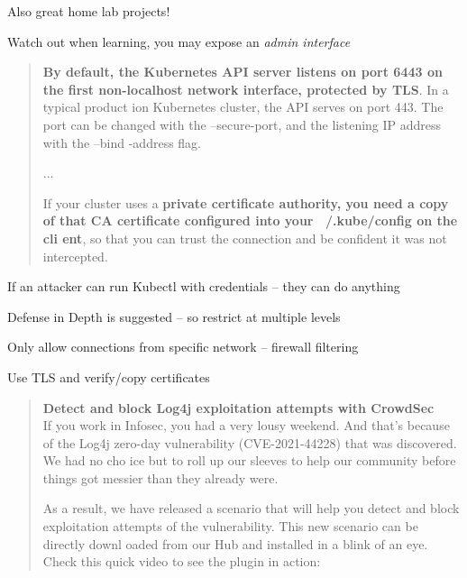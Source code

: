 \documentclass[Screen16to9,17pt]{foils}
\begin{document}
Also great home lab projects!



Watch out when learning, you may expose an \emph{admin interface}
\begin{quote}{\bf
By default, the Kubernetes API server listens on port 6443 on the first non-localhost network interface, protected by TLS}. In a typical product
ion Kubernetes cluster, the API serves on port 443. The port can be changed with the --secure-port, and the listening IP address with the --bind
-address flag.

...

If your cluster uses a {\bf private certificate authority, you need a copy of that CA certificate configured into your ~/.kube/config on the cli
ent}, so that you can trust the connection and be confident it was not intercepted.
\end{quote}

\begin{list2}
\item If an attacker can run Kubectl with credentials -- they can do anything
\item Defense in Depth is suggested -- so restrict at multiple levels
\item Only allow connections from specific network -- firewall filtering
\item Use TLS and verify/copy certificates
\end{list2}



\begin{quote}
{\bf Detect and block Log4j exploitation attempts with CrowdSec}\\
If you work in Infosec, you had a very lousy weekend. And that’s because of the Log4j zero-day vulnerability (CVE-2021-44228) that was discovered. We had no cho
ice but to roll up our sleeves to help our community before things got messier than they already were.

As a result, we have released a scenario that will help you detect and block exploitation attempts of the vulnerability. This new scenario can be directly downl
oaded from our Hub and installed in a blink of an eye. Check this quick video to see the plugin in action:
\end{quote}
\end{document}
